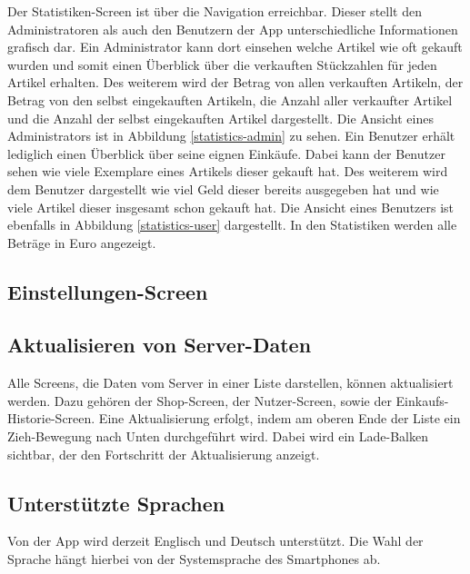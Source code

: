 Der Statistiken-Screen ist über die Navigation erreichbar. Dieser stellt den Administratoren als auch den Benutzern der App unterschiedliche Informationen grafisch dar. Ein Administrator kann dort einsehen welche Artikel wie oft gekauft wurden und somit einen Überblick über die verkauften Stückzahlen für jeden Artikel erhalten. Des weiterem wird der Betrag von allen verkauften Artikeln, der Betrag von den selbst eingekauften Artikeln, die Anzahl aller verkaufter Artikel und die Anzahl der selbst eingekauften Artikel dargestellt. Die Ansicht eines Administrators ist in Abbildung \ref{statistics-admin} zu sehen. Ein Benutzer erhält lediglich einen Überblick über seine eignen Einkäufe. Dabei kann der Benutzer sehen wie viele Exemplare eines Artikels dieser gekauft hat. Des weiterem wird dem Benutzer dargestellt wie viel Geld dieser bereits ausgegeben hat und wie viele Artikel dieser insgesamt schon gekauft hat. Die Ansicht eines Benutzers ist ebenfalls in Abbildung \ref{statistics-user} dargestellt. In den Statistiken werden alle Beträge in Euro angezeigt.


\subsection{Einstellungen-Screen} \label{subsec:settings-screen}

\subsection{Aktualisieren von Server-Daten}

Alle Screens, die Daten vom Server in einer Liste darstellen, können aktualisiert werden.
Dazu gehören der Shop-Screen, der Nutzer-Screen, sowie der Einkaufs-Historie-Screen.
Eine Aktualisierung erfolgt, indem am oberen Ende der Liste ein Zieh-Bewegung nach Unten durchgeführt wird.
Dabei wird ein Lade-Balken sichtbar, der den Fortschritt der Aktualisierung anzeigt.

\subsection{Unterstützte Sprachen} \label{subsec:languages}

Von der App wird derzeit Englisch und Deutsch unterstützt. Die Wahl der Sprache hängt hierbei von der Systemsprache des Smartphones ab.

